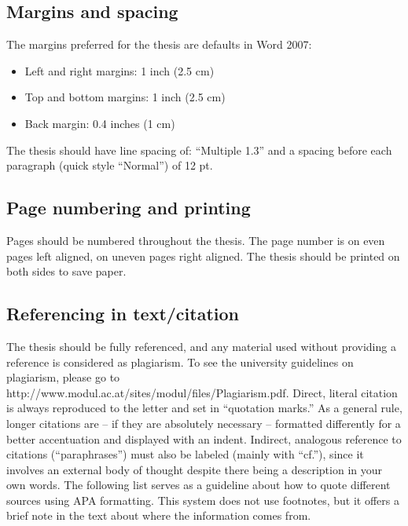 \subsection{Margins and spacing}
\label{sec:margins}

The margins preferred for the thesis are defaults in Word 2007:
\begin{itemize}
\item Left and right margins: 1 inch (2.5 cm)
\item Top and bottom margins: 1 inch (2.5 cm)
\item Back margin: 0.4 inches (1 cm)
\end{itemize}
	
The thesis should have line spacing of: “Multiple 1.3” and a spacing before each paragraph (quick style “Normal”) of 12 pt. 

\subsection{Page numbering and printing}
\label{sec:pagenumbering}

Pages should be numbered throughout the thesis. The page number is on even pages left aligned, on uneven pages right aligned. The thesis should be printed on both sides to save paper. 

\subsection{Referencing in text/citation}
\label{sec:referencing}
The thesis should be fully referenced, and any material used without providing a reference is considered as plagiarism. 
To see the university guidelines on plagiarism, please go to http://www.modul.ac.at/sites/modul/files/Plagiarism.pdf. 
Direct, literal citation is always reproduced to the letter and set in “quotation marks.” As a general rule, longer citations are – if they are absolutely necessary – 
formatted differently for a better accentuation and displayed with an indent. Indirect, analogous reference to citations (“paraphrases”) must also be 
labeled (mainly with “cf.”), since it involves an external body of thought despite there being a description in your own words. The following list serves as a 
guideline about how to quote different sources using APA formatting. 
This system does not use footnotes, but it offers a brief note in the text about where the information comes from. 

